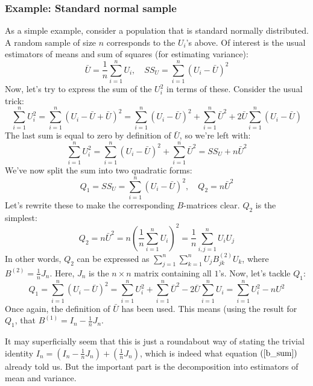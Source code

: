 \documentclass[12pt, a4paper]{article}
\begin{document}
\subsubsection{Example: Standard normal sample}
As a simple example, consider a population that is standard normally distributed. A random sample of size $n$ corresponds to the $U_i$'s above. Of interest is the usual estimators of means and sum of squares (for estimating variance):
\begin{equation}
\bar{U}=\frac{1}{n}\sum_{i=1}^n U_i,\quad SS_U=\sum_{i=1}^n(U_i-\bar{U})^2
\end{equation}
Now, let's try to express the sum of the $U_i^2$ in terms of these. Consider the usual trick:
\begin{equation}
\sum_{i=1}^n U_i^2 = \sum_{i=1}^n(U_i-\bar{U}+\bar{U})^2=\sum_{i=1}^n(U_i-\bar{U})^2+\sum_{i=1}^n\bar{U}^2+2\bar{U}\sum_{i=1}^n(U_i-\bar{U})
\end{equation}
The last sum is equal to zero by definition of $\bar{U}$, so we're left with:
\begin{equation}
\sum_{i=1}^n U_i^2 = \sum_{i=1}^n(U_i-\bar{U})^2+\sum_{i=1}^n\bar{U}^2 = SS_U + n\bar{U}^2
\end{equation}
We've now split the sum into two quadratic forms:
\begin{equation}
Q_1=SS_U=\sum_{i=1}^n(U_i-\bar{U})^2,\quad Q_2=n\bar{U}^2
\end{equation}
Let's rewrite these to make the corresponding $B$-matrices clear. $Q_2$ is the simplest:
\begin{equation}
Q_2=n\bar{U}^2=n\left(\frac{1}{n}\sum_{i=1}^n U_i\right)^2=\frac{1}{n}\sum_{i,j=1}^n U_i U_j
\end{equation}
In other words, $Q_2$ can be expressed as $\sum_{j=1}^n\sum_{k=1}^n U_j B^{(2)}_{jk}U_k$, where $B^{(2)}=\frac{1}{n}J_n$. Here, $J_n$ is the $n\times n$ matrix containing all $1$'s. Now, let's tackle $Q_1$:
\begin{equation}
Q_1=\sum_{i=1}^n(U_i-\bar{U})^2=\sum_{i=1}^n U_i^2 + \sum_{i=1}^n\bar{U}^2 - 2\bar{U}\sum_{i=1}^n U_i = \sum_{i=1}^n U_i^2 - n{U}^2  
\end{equation}
Once again, the definition of $\bar{U}$ has been used. This means (using the result for $Q_1$, that $B^{(1)}=I_n-\frac{1}{n}J_n$.\par
It may superficially seem that this is just a roundabout way of stating the trivial identity $I_n = \left(I_n-\frac{1}{n}J_n\right) + \left(\frac{1}{n}J_n\right)$, which is indeed what equation $(\ref{b_sum})$ already told us. But the important part is the decomposition into estimators of mean and variance.
\end{document}
